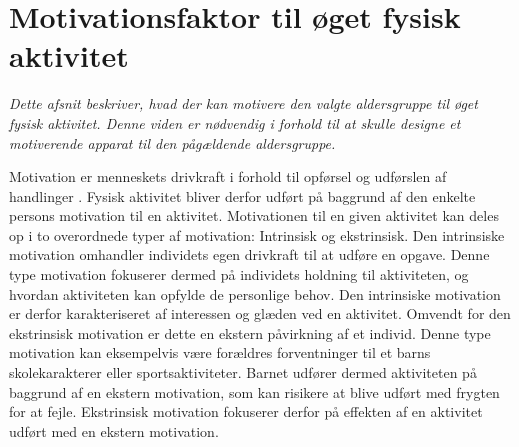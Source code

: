 \section{Motivationsfaktor til øget fysisk aktivitet}\label{motivation_boern}
\textit{Dette afsnit beskriver, hvad der kan motivere den valgte aldersgruppe til øget fysisk aktivitet. Denne viden er nødvendig i forhold til at skulle designe et motiverende apparat til den pågældende aldersgruppe.}

Motivation er menneskets drivkraft i forhold til opførsel og udførslen af handlinger \citep{V.Brown2007}. Fysisk aktivitet bliver derfor udført på baggrund af den enkelte persons motivation til en aktivitet. Motivationen til en given aktivitet kan deles op i to overordnede typer af motivation: Intrinsisk og ekstrinsisk. Den intrinsiske motivation omhandler individets egen drivkraft til at udføre en opgave. Denne type motivation fokuserer dermed på individets holdning til aktiviteten, og hvordan aktiviteten kan opfylde de personlige behov. Den intrinsiske motivation er derfor karakteriseret af interessen og glæden ved en aktivitet. Omvendt for den ekstrinsisk motivation er dette en ekstern påvirkning af et individ. Denne type motivation kan eksempelvis være forældres forventninger til et barns skolekarakterer eller sportsaktiviteter. Barnet udfører dermed aktiviteten på baggrund af en ekstern motivation, som kan risikere at blive udført med frygten for at fejle. Ekstrinsisk motivation fokuserer derfor på effekten af en aktivitet udført med en ekstern motivation. \citep{J.Sebire2013} 

